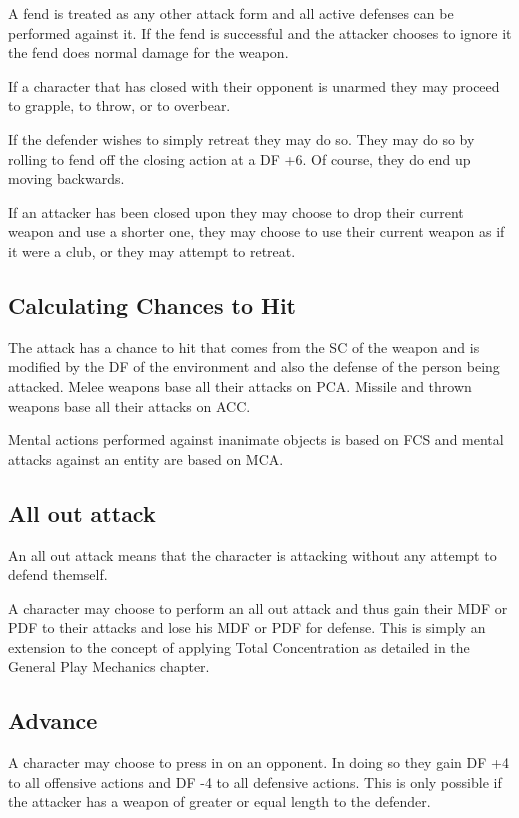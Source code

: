 A fend is treated as any other attack form and all active defenses can be
performed against it. If the fend is successful and the attacker chooses
to ignore it the fend does normal damage for the weapon.

If a character that has closed with their opponent is unarmed
they may proceed to grapple, to throw, or to overbear.

If the defender wishes to simply retreat they may do so. They
may do so by rolling to fend off the closing action at a DF +6.
Of course, they do end up moving backwards.

If an attacker has been closed upon they may choose to drop their
current weapon and use a shorter one, they may choose to use their
current weapon as if it were a club, or they may attempt to retreat.

\subsection{Calculating Chances to Hit}

The attack has a chance to hit that comes from the SC of the weapon and
is modified by the DF of the environment and also the defense of the
person being attacked. Melee
weapons base all their attacks on PCA. Missile and thrown weapons
base all their attacks on ACC.

Mental actions performed against inanimate objects is based on FCS
and mental attacks against an entity are based on MCA.

\subsection{All out attack}

An all out attack means that the character is attacking without any attempt to defend themself.

A character may choose to perform an all out attack and thus gain
their MDF or PDF to their attacks and lose his MDF or PDF for defense. This is simply an
extension to the concept of applying Total Concentration as detailed
in the General Play Mechanics chapter.

\subsection{Advance}


A character may choose to press in on an opponent. In doing so
they gain DF +4 to all offensive actions and DF -4 to all defensive
actions. This is only possible if the attacker has a weapon of greater
or equal length to the defender.

